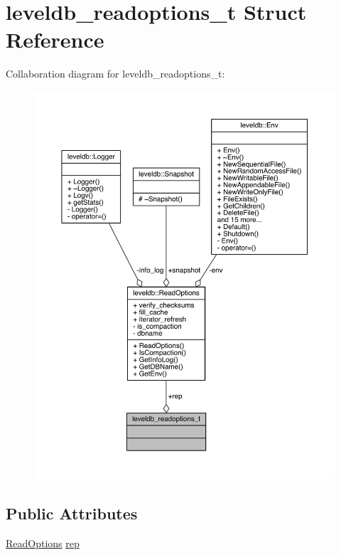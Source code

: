 \hypertarget{structleveldb__readoptions__t}{}\section{leveldb\+\_\+readoptions\+\_\+t Struct Reference}
\label{structleveldb__readoptions__t}


Collaboration diagram for leveldb\+\_\+readoptions\+\_\+t\+:
\nopagebreak
\begin{figure}[H]
\begin{center}
\leavevmode
\includegraphics[width=350pt]{structleveldb__readoptions__t__coll__graph}
\end{center}
\end{figure}
\subsection*{Public Attributes}
\begin{DoxyCompactItemize}
\item 
\hyperlink{structleveldb_1_1_read_options}{Read\+Options} \hyperlink{structleveldb__readoptions__t_ad4bc0f881cf2c7a859642cd878dd568c}{rep}
\end{DoxyCompactItemize}


